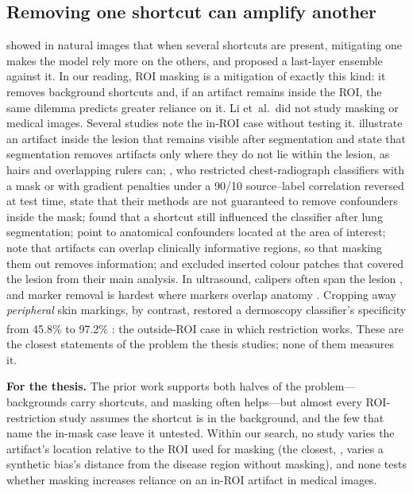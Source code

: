 \documentclass[11pt,a4paper]{article}
\newcommand{\takeaway}[1]{\par\smallskip\noindent\colorbox{gray!12}{\parbox{\dimexpr\linewidth-2\fboxsep}{\small\textbf{For the thesis.} #1}}\par\medskip}
\newcommand{\bg}{\textsuperscript{\dag}}
\begin{document}
\subsection{Removing one shortcut can amplify another}
\citet{li2023whacamole} showed in natural images that when several shortcuts are present, mitigating one makes the
model rely more on the others, and proposed a last-layer ensemble against it. In our reading, ROI masking is a
mitigation of exactly this kind: it removes background shortcuts and, if an artifact remains inside the ROI, the same
dilemma predicts greater reliance on it. Li et~al.\ did not study masking or medical images.
Several studies note the in-ROI case without testing it. \citet{maron2021confounding} illustrate an artifact inside the lesion that remains visible after segmentation and state that segmentation removes artifacts only where they do not lie within the lesion, as hairs and overlapping rulers can; \citet{viviano2021saliency}, who restricted chest-radiograph classifiers with a mask or with gradient penalties under a 90/10 source--label correlation reversed at test time, state that their methods are not guaranteed to remove confounders inside the mask; \citet{benahmed2022multisite} found that a shortcut still influenced the classifier after lung segmentation; \citet{sourget2025mask} point to anatomical confounders located at the area of interest; \citet{pahde2023r2r,pahde2025ensuring} note that artifacts can overlap clinically informative regions, so that masking them out removes information; and \citet{nauta2022uncovering} excluded inserted colour patches that covered the lesion from their main analysis. In ultrasound, calipers often span the lesion \citep{bunnell2024busclean}, and marker removal is hardest where markers overlap anatomy \citep{wang2026echodm}. Cropping away \emph{peripheral} skin markings, by contrast, restored a dermoscopy classifier's specificity from 45.8\% to 97.2\% \citep{winkler2019markings}\bg: the outside-ROI case in which restriction works. These are the closest statements of the problem the thesis studies; none of them measures it.
\takeaway{The prior work supports both halves of the problem---backgrounds carry shortcuts, and masking often
helps---but almost every ROI-restriction study assumes the shortcut is in the background, and the few that name the
in-mask case leave it untested. Within our search, no study varies
the artifact's location relative to the ROI used for masking (the closest, \citealp{stanley2024simba}, varies a synthetic
bias's distance from the disease region without masking), and none tests whether masking increases reliance on an in-ROI artifact
in medical images.}
\end{document}
